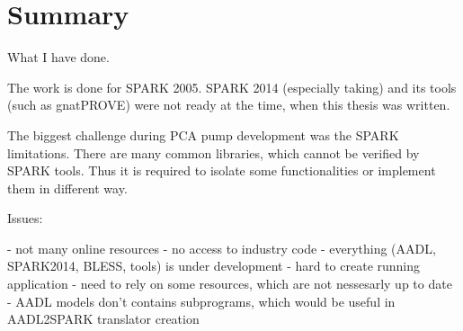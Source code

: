 
\cleardoublepage

\chapter{Summary}
\label{summary}

What I have done.

The work is done for SPARK 2005. SPARK 2014 (especially taking) and its tools (such as gnatPROVE) were not ready at the time, when this thesis was written.

The biggest challenge during PCA pump development was the SPARK limitations. There are many common libraries, which cannot be verified by SPARK tools. Thus it is required to isolate some functionalities or implement them in different way.

Issues:

- not many online resources
- no access to industry code
- everything (AADL, SPARK2014, BLESS, tools) is under development
- hard to create running application
- need to rely on some resources, which are not nessesarly up to date
- AADL models don't contains subprograms, which would be useful in AADL2SPARK translator creation